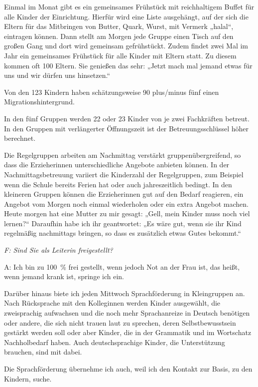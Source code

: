 \begin{linenumbers*}
Einmal im Monat gibt es ein gemeinsames Frühstück mit reichhaltigem Buffet für alle Kinder der Einrichtung. Hierfür wird eine Liste ausgehängt, auf der sich die Eltern für das Mitbringen von Butter, Quark, Wurst, mit Vermerk „halal“, eintragen können. Dann stellt am Morgen jede Gruppe einen Tisch auf den großen Gang und dort wird gemeinsam gefrühstückt. 
Zudem findet zwei Mal im Jahr ein gemeinsames Frühstück für alle Kinder mit Eltern statt. Zu diesem kommen oft 100 Eltern. Sie genießen das sehr: „Jetzt mach mal jemand etwas für uns und wir dürfen uns hinsetzen.“ 

Von den 123 Kindern haben schätzungsweise 90 plus/minus fünf einen Migrationshintergrund. 

In den fünf Gruppen werden 22 oder 23 Kinder von je zwei Fachkräften betreut. In den Gruppen mit verlängerter Öffnungszeit ist der Betreuungsschlüssel höher berechnet. 

Die Regelgruppen arbeiten am Nachmittag verstärkt gruppenübergreifend, so dass die Erzieherinnen unterschiedliche Angebote anbieten können. 
In der Nachmittagsbetreuung variiert die Kinderzahl der Regelgruppen, zum Beispiel wenn die Schule bereits Ferien hat oder auch jahreszeitlich bedingt.  
In den kleineren Gruppen können die Erzieherinnen gut auf den Bedarf reagieren, ein Angebot vom Morgen noch einmal wiederholen oder ein extra Angebot machen. 
Heute morgen hat eine Mutter zu mir gesagt: „Gell, mein Kinder muss noch viel lernen?“ Daraufhin habe ich ihr geantwortet: „Es wäre gut, wenn sie ihr Kind regelmäßig nachmittags bringen, so dass es zusätzlich etwas Gutes bekommt.“ 

\emph{F: Sind Sie als Leiterin freigestellt?}	

A: Ich bin zu 100~\% frei gestellt, wenn jedoch Not an der Frau ist, das heißt, wenn jemand krank ist, springe ich ein. 
 
Darüber hinaus biete ich jeden Mittwoch Sprachförderung in Kleingruppen an. Nach Rücksprache mit den Kolleginnen werden Kinder ausgewählt, die zweisprachig aufwachsen und die noch mehr Sprachanreize in Deutsch benötigen oder andere, die sich nicht trauen laut zu sprechen, deren Selbstbewusstsein gestärkt werden soll oder aber Kinder, die in der Grammatik und im Wortschatz Nachholbedarf haben. Auch deutschsprachige Kinder, die Unterstützung brauchen, sind mit dabei. 

Die Sprachförderung übernehme ich auch, weil ich den Kontakt zur Basis, zu den Kindern, suche. 


\end{linenumbers*}
